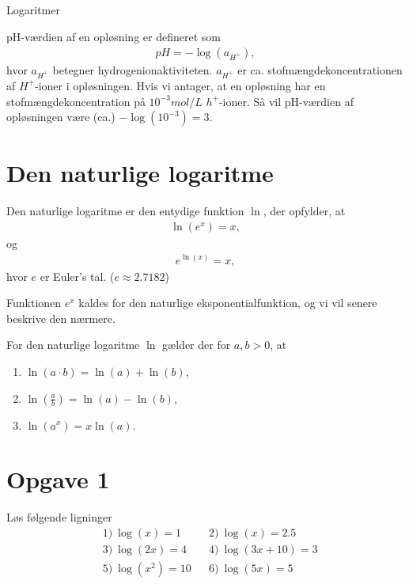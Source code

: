 
\begin{center}
\Huge
Logaritmer
\end{center}
\begin{exa}
pH-værdien af en opløsning er defineret som
\begin{align*}
pH = -\log(a_{H^+}),
\end{align*}
hvor $a_{H^+}$ betegner hydrogenionaktiviteten. $a_{H^{+}}$ er ca. stofmængdekoncentrationen af $H^{+}$-ioner i opløsningen. Hvis vi antager, at en opløsning har en stofmængdekoncentration på $10^{-3}mol/L$ $h^+$-ioner. Så vil 
pH-værdien af opløsningen være (ca.) $-\log(10^{-3}) = 3$.  
\end{exa}
\section*{Den naturlige logaritme}
\begin{defn}
Den naturlige logaritme er den entydige funktion $\ln$, der opfylder, at
\begin{align*}
\ln(e^x) = x, 
\end{align*}
og
\begin{align*}
e^{\ln(x)} = x,
\end{align*}
hvor $e$ er Euler's tal. ($e \approx 2.7182$)
\end{defn}
Funktionen $e^x$ kaldes for den naturlige eksponentialfunktion, og vi vil senere beskrive den nærmere.

\begin{setn}
For den naturlige logaritme $\ln$ gælder der for $a,b>0$, at
\begin{enumerate}[label=\roman*)]
\item $\ln(a\cdot b) = \ln(a) + \ln(b)$,
\item $\ln(\frac{a}{b}) = \ln(a)-\ln(b)$,
\item $\ln(a^x) = x\ln(a)$.
\end{enumerate}
\end{setn}
\section*{Opgave 1}
Løs følgende ligninger
\begin{align*}
&1) \  \log(x) = 1  &&2) \ \log(x) = 2.5    \\
&3) \ \log(2x) = 4   &&4) \ \log(3x+10)=3    \\
&5) \ \log(x^2) = 10   &&6) \  \log(5x) = 5    \\
\end{align*}
